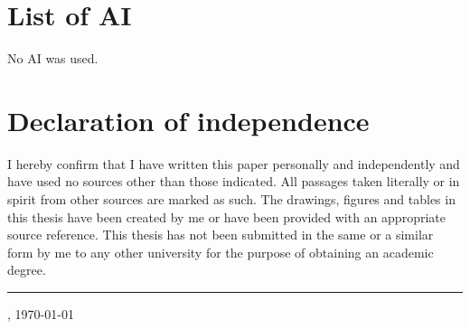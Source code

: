 
\printbibliography[heading=bibintoc, title={Bibliography}]

\clearpage

\section{List of AI}
No AI was used.

\clearpage

\section{Declaration of independence}
I hereby confirm that I have written this paper personally and independently and have used no
sources other than those indicated. All passages taken literally or in spirit from other sources are
marked as such. The drawings, figures and tables in this thesis have been created by me or have been
provided with an appropriate source reference. This thesis has not been submitted in the same or a
similar form by me to any other university for the purpose of obtaining an academic degree.

\vspace{5cm}
\hrule
\place, \today \hfill \Author
